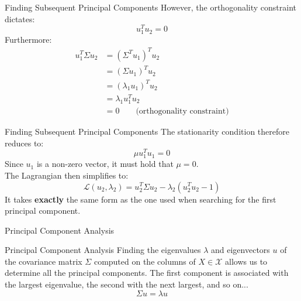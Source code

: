 \begin{frame}{Finding Subsequent Principal Components}
	However, the orthogonality constraint dictates:
	\begin{equation}
		u_1^T u_2 = 0 
		\nonumber
	\end{equation}
	\pause
	Furthermore:
	\begin{equation}
		\begin{aligned}
			u_1^T \Sigma u_2 
			&= \left(\Sigma^T u_1\right)^T u_2 \\
			&= \left(\Sigma u_1\right)^T u_2 \\
			&= \left(\lambda_1 u_1\right)^T u_2 \\
			&= \lambda_1 u_1^T u_2 \\
			&= 0 \quad \quad \text{(orthogonality constraint)}
		\end{aligned}
		\nonumber
	\end{equation}
\end{frame}

\begin{frame}{Finding Subsequent Principal Components}
	The stationarity condition therefore reduces to:
	\begin{equation}
		\mu u_1^T u_1 = 0
		\nonumber
	\end{equation}
	Since $u_1$ is a non-zero vector, it must hold that $\mu = 0$. \\
	\pause
	\vspace{0.5cm}
	The Lagrangian then simplifies to:
	\begin{equation}
		\mathcal{L}(u_2, \lambda_2) = u_2^T \Sigma u_2 - \lambda_2 \left(u_2^T u_2 - 1\right)
		\nonumber
	\end{equation}
	\pause
	It takes \textbf{exactly} the same form as the one used when searching for the first principal component.
\end{frame}

\begin{frame}{Principal Component Analysis}
	\begin{block}{Principal Component Analysis}
		Finding the eigenvalues $\lambda$ and eigenvectors $u$ of the covariance matrix $\Sigma$ computed on the columns of $X \in \mathcal{X}$ allows us to determine all the principal components. The first component is associated with the largest eigenvalue, the second with the next largest, and so on...
		\begin{equation}
			\Sigma u = \lambda u
			\nonumber
		\end{equation}
	\end{block}
\end{frame}